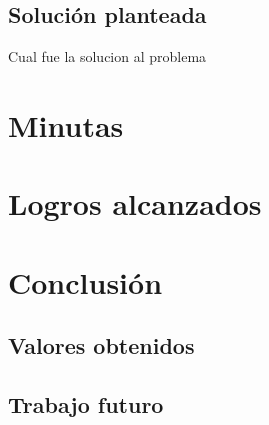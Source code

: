 \documentclass[a4paper,oneside,10pt]{article}
\begin{document}
\subsection{Soluci\'on planteada}
Cual fue la solucion al problema

\section{Minutas}

\section{Logros alcanzados}

\section{Conclusi\'on}

\subsection{Valores obtenidos}
\subsection{Trabajo futuro}
\end{document}
